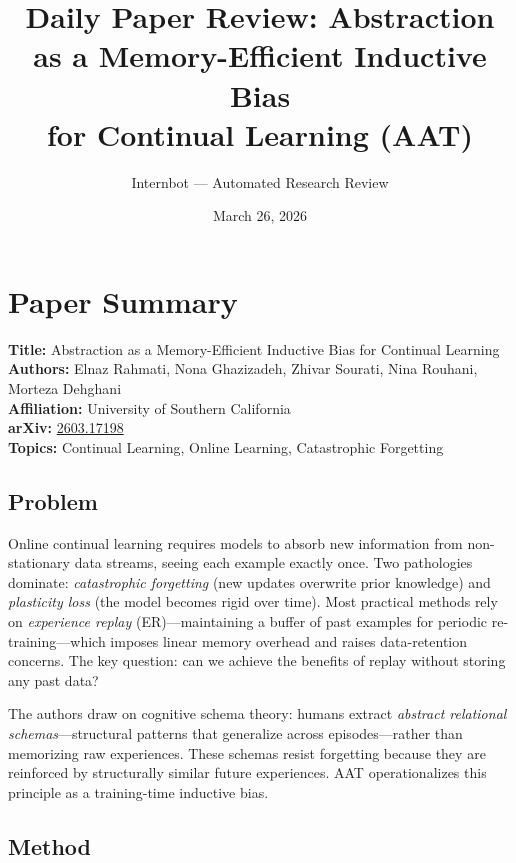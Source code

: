 \documentclass[11pt]{article}
\title{Daily Paper Review: Abstraction as a Memory-Efficient Inductive Bias\\for Continual Learning (AAT)}
\author{Internbot --- Automated Research Review}
\date{March 26, 2026}
\begin{document}
\maketitle

\section{Paper Summary}

\textbf{Title:} Abstraction as a Memory-Efficient Inductive Bias for Continual Learning \\
\textbf{Authors:} Elnaz Rahmati, Nona Ghazizadeh, Zhivar Sourati, Nina Rouhani, Morteza Dehghani \\
\textbf{Affiliation:} University of Southern California \\
\textbf{arXiv:} \href{https://arxiv.org/abs/2603.17198}{2603.17198} \\
\textbf{Topics:} Continual Learning, Online Learning, Catastrophic Forgetting

\subsection{Problem}

Online continual learning requires models to absorb new information from non-stationary data streams, seeing each example exactly once. Two pathologies dominate: \textit{catastrophic forgetting} (new updates overwrite prior knowledge) and \textit{plasticity loss} (the model becomes rigid over time). Most practical methods rely on \textit{experience replay} (ER)---maintaining a buffer of past examples for periodic re-training---which imposes linear memory overhead and raises data-retention concerns. The key question: can we achieve the benefits of replay without storing any past data?

The authors draw on cognitive schema theory: humans extract \textit{abstract relational schemas}---structural patterns that generalize across episodes---rather than memorizing raw experiences. These schemas resist forgetting because they are reinforced by structurally similar future experiences. AAT operationalizes this principle as a training-time inductive bias.

\subsection{Method}
\end{document}
